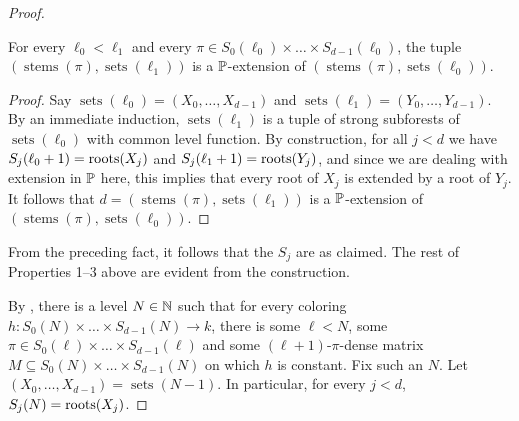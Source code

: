 \begin{proof}

\verification

\begin{claim}\label{fact:hl-sca-density-below-a-cone-condition-extension}
For every $\ell_0 < \ell_1$ and every $\pi \in S_0(\ell_0) \times \dots \times S_{d-1}(\ell_0)$,
the tuple $(\operatorname{stems}(\pi), \operatorname{sets}(\ell_1))$ is a $\mathbb{P}$-extension of $(\operatorname{stems}(\pi), \operatorname{sets}(\ell_0))$.
\end{claim}
\begin{proof}
Say $\operatorname{sets}(\ell_0) = (X_0, \dots, X_{d-1})$ and $\operatorname{sets}(\ell_1) = (Y_0, \dots, Y_{d-1})$. By an immediate induction, $\operatorname{sets}(\ell_1)$ is a tuple of strong subforests of $\operatorname{sets}(\ell_0)$ with common level function.
By construction, for all $j < d$ we have $S_j(\ell_0+1) = \operatorname{roots}(X_j)$ and  $S_j(\ell_1+1) = \operatorname{roots}(Y_j)$, and since we are dealing with extension in $\mathbb{P}$ here, this implies that every root of $X_j$ is extended by a root of $Y_j$.
It follows that $d = (\operatorname{stems}(\pi), \operatorname{sets}(\ell_1))$ is a $\mathbb{P}$-extension of $(\operatorname{stems}(\pi), \operatorname{sets}(\ell_0))$.
\end{proof}

From the preceding fact, it follows that the $S_j$ are as claimed. The rest of Properties 1--3 above are evident from the construction.


By , there is a level $N \in \mathbb{N}$
such that for every coloring $h: S_0(N) \times \dots \times S_{d-1}(N) \to k$,
there is some $\ell < N$, some $\pi \in S_0(\ell) \times \dots \times S_{d-1}(\ell)$
and some $(\ell+1)$-$\pi$-dense matrix $M \subseteq S_0(N) \times \dots \times S_{d-1}(N)$
on which $h$ is constant.
Fix such an $N$. Let $(X_0, \dots, X_{d-1}) = \operatorname{sets}(N-1)$. In particular, for every $j < d$, $S_j(N) = \operatorname{roots}(X_j)$.


\end{proof}
